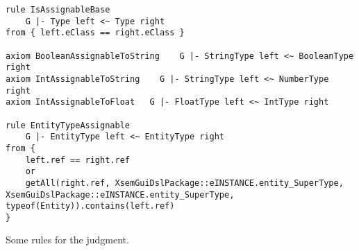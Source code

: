 % 
% 

\begin{listing}[tb]
\begin{lstlisting}[language=xsemantics] 
rule IsAssignableBase
	G |- Type left <~ Type right
from { left.eClass == right.eClass }

axiom BooleanAssignableToString    G |- StringType left <~ BooleanType right
axiom IntAssignableToString    G |- StringType left <~ NumberType right
axiom IntAssignableToFloat   G |- FloatType left <~ IntType right

rule EntityTypeAssignable
	G |- EntityType left <~ EntityType right
from {
	left.ref == right.ref
	or
	getAll(right.ref, XsemGuiDslPackage::eINSTANCE.entity_SuperType, XsemGuiDslPackage::eINSTANCE.entity_SuperType, typeof(Entity)).contains(left.ref)
}
\end{lstlisting}
\caption{Some rules for the  judgment.}
\label{lst:xsem-assignable}
\end{listing}

